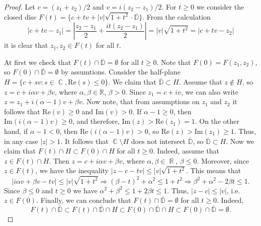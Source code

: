 \documentclass{amsart}
\numberwithin{equation}{section}
\theoremstyle{definition}
\theoremstyle{remark}
\DeclareMathOperator{\CC}{\mathbb C}
\DeclareMathOperator{\RR}{\mathbb R}
\begin{document}
	\begin{proof}
		Let $c = (z_1 + z_2)/2$ and $v = i(z_2 - z_1)/2$. For $t \ge 0$ we consider the closed disc $F(t) = \{c + tv + |v|\sqrt{1 + t^2}\cdot\overline{\mathbb D}\}$. From the calculation
		\[
		|c + tv - z_1| = \left| \dfrac{z_2 - z_1}{2} + \dfrac{it(z_2 - z_1)}{2} \right| = |v|\sqrt{1 + t^2} = |c + tv - z_2|
		\]
		it is clear that $z_1, z_2 \in F(t)$ for all $t$.
		
		At first we check that $F(t) \cap \overline{\mathbb D} = \emptyset$ for all $t \ge 0$. Note that $F(0) = F(z_1,z_2)$, so $F(0) \cap \overline{\mathbb D} = \emptyset$ by assumtions. Consider the half-plane $H = \{c + s v: s \in \CC, \mathrm{Re}(s) \le 0\}$. We claim that $\overline{\mathbb D} \subset H$. Assume that $z \notin H$, so $z = c + i\alpha v + \beta v$, where $\alpha, \beta \in \mathbb R$, $\beta > 0$. Since $z_1 = c + iv$, we can also write $z = z_1 + i(\alpha - 1)v + \beta v$. Now note, that from assumptions on $z_1$ and $z_2$ it follows that $\mathrm{Re}(v) \ge 0$ and $\mathrm{Im}(v) > 0$. If $\alpha - 1 \ge 0$, then $\mathrm{Im}(i (\alpha - 1) v) \ge 0$, and therefore, $\mathrm{Im}(z) > \mathrm{Re}(z_1) = 1$. On the other hand, if $\alpha - 1 < 0$, then $\mathrm{Re}(i(\alpha - 1)v) > 0$, so $\mathrm{Re}(z) > \mathrm{Im}(z_1) \ge 1$. Thus, in any case $|z| > 1$. It follows that $\CC \setminus H$ does not intersect $\overline{\mathbb D}$, so $\overline{\mathbb D} \subset H$. Now we claim that $F(t) \cap H \subset F(0) \cap H$ for all $t \ge 0$. Indeed, assume that $z \in F(t) \cap H$. Then $z = c + i \alpha v + \beta v$, where $\alpha, \beta \in \RR$, $\beta \le 0$. Moreover, since $z \in F(t)$, we have the inequality $|z - c - tv| \le |v|\sqrt{1 + t^2}$. This means that
		\[
		|i\alpha v + \beta v - tv| \le |v| \sqrt{1 + t^2} \Rightarrow (\beta - t)^2 + \alpha^2 \le 1 + t^2 \Rightarrow \beta^2 + \alpha^2 - 2\beta t \le 1.
		\]
		Since $\beta \le 0$ and $t \ge 0$ we have $\alpha^2 + \beta^2 \le 1 + 2 \beta t \le 1$. Thus, $|z - c| \le |v|$, i.e. $z \in F(0)$. Finally, we can conclude that $F(t) \cap \overline{\mathbb D} = \emptyset$ for all $t \ge 0$. Indeed, \[
		F(t) \cap \overline{\mathbb D} \subset F(t) \cap \overline{\mathbb D} \cap H \subset F(0) \cap \overline{\mathbb D} \cap H \subset F(0) \cap \overline{\mathbb D} = \emptyset.
		\]
		

\end{proof}
\end{document}
